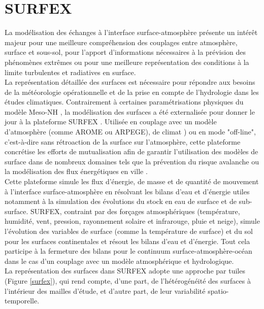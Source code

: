 \section{{\selectfont SURFEX}}
\label{sec:SURFEX}
La modélisation des échanges à l'interface surface-atmosphère présente un intérêt majeur pour une meilleure compréhension des couplages entre atmosphère, surface et sous-sol, pour l'apport d'informations nécessaires à la prévision des phénomènes extrêmes ou pour une meilleure représentation des conditions à la limite turbulentes et radiatives en surface.\\
La représentation détaillée des surfaces est nécessaire pour répondre aux besoins de la météorologie opérationnelle et de la prise en compte de l'hydrologie dans les études climatiques. Contrairement à certaines paramétrisations physiques du modèle Meso-NH \citep{lac2018}, la modélisation des surfaces a été externalisée pour donner le jour à la plateforme SURFEX \citep[Surface Externalisée]{masson2013}. Utilisée en couplage avec un modèle d'atmosphère (comme AROME ou ARPEGE), de climat \citet[CNRM-CM]{voldoire2019}) ou en mode "off-line", c'est-à-dire sans rétroaction de la surface sur l'atmosphère, cette plateforme concrétise les efforts de mutualisation afin de garantir l'utilisation des modèles de surface dans de nombreux domaines  tels que la prévention du risque avalanche ou la modélisation des flux énergétiques en ville \citep{vionnet2012,schoetter2017,lemoigne2020}. \\
Cette plateforme simule les flux d'énergie, de masse et de quantité de mouvement à l'interface surface-atmosphère en résolvant les bilans d'eau et d'énergie utiles notamment à la simulation des évolutions du stock en eau de surface et de sub-surface. SURFEX, contraint par des forçages atmosphériques (température, humidité, vent, pression, rayonnement solaire et infrarouge, pluie et neige), simule l'évolution des variables de surface (comme la température de surface) et du sol pour les surfaces continentales et résout les bilans d'eau et d'énergie. Tout cela participe à la fermeture des bilans pour le continuum surface-atmosphère-océan dans le cas d'un couplage avec un modèle atmosphérique et hydrologique. \\
\clearpage
\noindent La représentation des surfaces dans SURFEX adopte une approche par tuiles (Figure \ref{surfex}), qui rend compte, d'une part, de l'hétérogénéité des surfaces à l'intérieur des mailles d'étude, et d'autre part, de leur variabilité spatio-temporelle.

